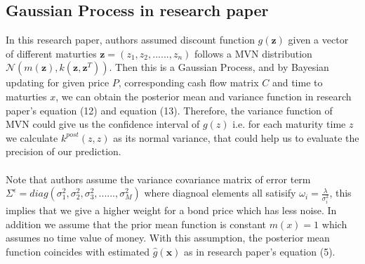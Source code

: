 \subsection{Gaussian Process in research paper}
In this research paper, authors assumed discount function $g(\boldsymbol{z})$ given a vector of different maturties $\boldsymbol{z} = (z_1, z_2, ......, z_n)$ follows a MVN distribution $\mathcal{N}(m(\boldsymbol{z}), k(\boldsymbol{z}, \boldsymbol{z}^T))$. Then this is a Gaussian Process, and by Bayesian updating for given price $P$, corresponding cash flow matrix $C$ and time to maturties $x$, we can obtain the posterior mean and variance function in research paper's equation (12) and equation (13). Therefore, the variance function of MVN could give us the confidence interval of $g(z)$ i.e. for each maturity time $z$ we calculate $k^{post}(z,z)$ as its normal variance, that could help us to evaluate the precision of our prediction. \\ \\
Note that authors assume the variance covariance matrix of error term $\varSigma^{\epsilon} = diag(\sigma_{1}^{2}, \sigma_{2}^{2}, \sigma_{3}^{2}, ......, \sigma_{M}^{2}) $ where diagnoal elements all satisify $\omega_i = \frac{\lambda}{\sigma_{i}^{2}}$, this implies that we give a higher weight for a bond price which has less noise. In addition we assume that the prior mean function is constant $m(x) = 1$ which assumes no time value of money. With this assumption, the posterior mean function coincides with estimated $\hat{g}(\boldsymbol{x})$ as in research paper's equation (5). 



